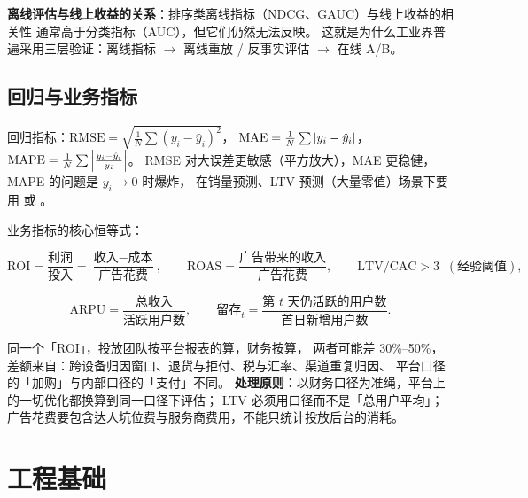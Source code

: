 \textbf{离线评估与线上收益的关系}：排序类离线指标（NDCG、GAUC）与线上收益的相关性
通常高于分类指标（AUC），但它们仍然无法反映。
这就是为什么工业界普遍采用三层验证：离线指标 $\to$ 离线重放 / 反事实评估
\cite{dudik2011ee,swaminathan2015counterfactual,saito2020doubly} $\to$ 在线 A/B。

\subsection{回归与业务指标}

回归指标：$\text{RMSE} = \sqrt{\frac{1}{N}\sum(y_i - \hat{y}_i)^2}$，
$\text{MAE} = \frac{1}{N}\sum\left\lvert y_i - \hat{y}_i \right\rvert$，
$\text{MAPE} = \frac{1}{N}\sum\left\lvert \frac{y_i - \hat{y}_i}{y_i} \right\rvert$。
RMSE 对大误差更敏感（平方放大），MAE 更稳健，MAPE 的问题是 $y_i \to 0$ 时爆炸，
在销量预测、LTV 预测（大量零值）场景下要用  或
。

业务指标的核心恒等式：

\begin{equation}
\text{ROI} = \frac{\text{利润}}{\text{投入}} = \frac{\text{收入} - \text{成本}}{\text{广告花费}},
\qquad
\text{ROAS} = \frac{\text{广告带来的收入}}{\text{广告花费}},
\qquad
\text{LTV}/\text{CAC} > 3 \;\; (\text{经验阈值}),
\label{eq:ltv-cac}
\end{equation}

\begin{equation}
\text{ARPU} = \frac{\text{总收入}}{\text{活跃用户数}},
\qquad
\text{留存}_t = \frac{\text{第 } t \text{ 天仍活跃的用户数}}{\text{首日新增用户数}} .
\label{eq:arpu}
\end{equation}

\begin{pitfall}[业务指标口径不一致是最大的成本来源]
同一个「ROI」，投放团队按平台报表的算，财务按算，
两者可能差 30\%--50\%，差额来自：跨设备归因窗口、退货与拒付、税与汇率、渠道重复归因、
平台口径的「加购」与内部口径的「支付」不同。
\textbf{处理原则}：以财务口径为准绳，平台上的一切优化都换算到同一口径下评估；
LTV 必须用口径而不是「总用户平均」；
广告花费要包含达人坑位费与服务商费用，不能只统计投放后台的消耗。
\end{pitfall}

\section{工程基础}

